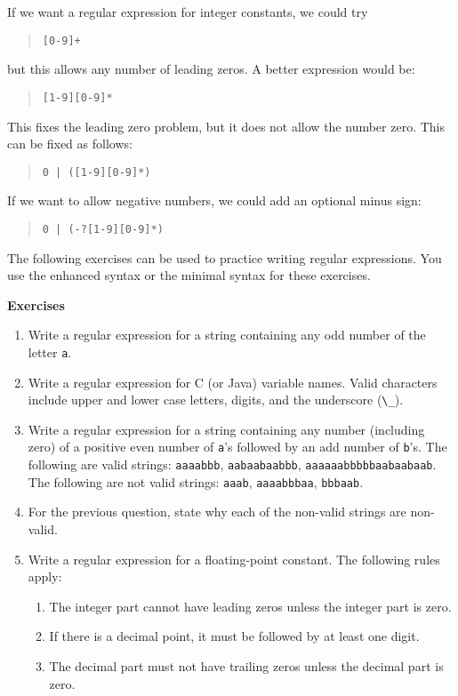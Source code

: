 \documentclass[letterpaper,12pt,openany,reqno]{book}%
\newcommand{\code}[1] {\lstinline[breaklines=yes,breakatwhitespace=yes]{#1}}
\begin{document}
If we want a regular expression for integer constants, we could try
\begin{quote}\code{[0-9]+}\end{quote}
but this allows any number of leading zeros. A better expression would be:
\begin{quote}\code{[1-9][0-9]*}\end{quote}
This fixes the leading zero problem, but it does not allow the number zero. This can be fixed as follows:
\begin{quote}\code{0 | ([1-9][0-9]*)}\end{quote}
If we want to allow negative numbers, we could add an optional minus sign:
\begin{quote}\code{0 | (-?[1-9][0-9]*)}\end{quote}

The following exercises can be used to practice writing regular expressions. You use the enhanced syntax or the minimal syntax for these exercises.

\textbf{Exercises}

\begin{enumerate}
\item Write a regular expression for a string containing any odd number of the letter \code{a}.
\item Write a regular expression for C (or Java) variable names. Valid characters include upper and lower case letters, digits, and the underscore (\code{\_}).
\item Write a regular expression for a string containing any number (including zero) of a positive even number of \code{a}'s followed by an add number of \code{b}'s. The following are valid strings: \code{aaaabbb}, \code{aabaabaabbb}, \code{aaaaaabbbbbaabaabaab}. The following are not valid strings: \code{aaab}, \code{aaaabbbaa}, \code{bbbaab}.
\item For the previous question, state why each of the non-valid strings are non-valid.
\item Write a regular expression for a floating-point constant. The following rules apply: 
\begin{enumerate}
\item The integer part cannot have leading zeros unless the integer part is zero. 
\item If there is a decimal point, it must be followed by at least one digit.
\item The decimal part must not have trailing zeros unless the decimal part is zero.
\end{enumerate}
\end{enumerate}
\end{document}

